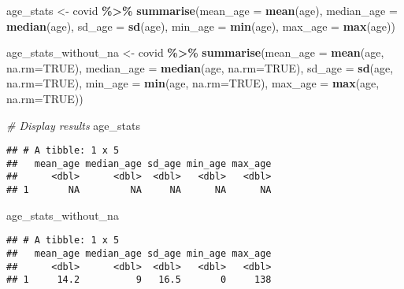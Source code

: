 \documentclass[
]{book}
\newenvironment{Shaded}{\begin{snugshade}}{\end{snugshade}}
\newcommand{\AttributeTok}[1]{\textcolor[rgb]{0.13,0.29,0.53}{#1}}
\newcommand{\CommentTok}[1]{\textcolor[rgb]{0.56,0.35,0.01}{\textit{#1}}}
\newcommand{\ConstantTok}[1]{\textcolor[rgb]{0.56,0.35,0.01}{#1}}
\newcommand{\FunctionTok}[1]{\textcolor[rgb]{0.13,0.29,0.53}{\textbf{#1}}}
\newcommand{\NormalTok}[1]{#1}
\newcommand{\OtherTok}[1]{\textcolor[rgb]{0.56,0.35,0.01}{#1}}
\newcommand{\SpecialCharTok}[1]{\textcolor[rgb]{0.81,0.36,0.00}{\textbf{#1}}}
\begin{document}
\begin{Shaded}
\begin{Highlighting}[]
\NormalTok{age\_stats }\OtherTok{\textless{}{-}}\NormalTok{ covid }\SpecialCharTok{\%\textgreater{}\%}
  \FunctionTok{summarise}\NormalTok{(}\AttributeTok{mean\_age =} \FunctionTok{mean}\NormalTok{(age),}
            \AttributeTok{median\_age =} \FunctionTok{median}\NormalTok{(age),}
            \AttributeTok{sd\_age =} \FunctionTok{sd}\NormalTok{(age),}
            \AttributeTok{min\_age =} \FunctionTok{min}\NormalTok{(age),}
            \AttributeTok{max\_age =} \FunctionTok{max}\NormalTok{(age))}


\NormalTok{age\_stats\_without\_na }\OtherTok{\textless{}{-}}\NormalTok{ covid }\SpecialCharTok{\%\textgreater{}\%}
  \FunctionTok{summarise}\NormalTok{(}\AttributeTok{mean\_age =} \FunctionTok{mean}\NormalTok{(age, }\AttributeTok{na.rm=}\ConstantTok{TRUE}\NormalTok{),}
            \AttributeTok{median\_age =} \FunctionTok{median}\NormalTok{(age, }\AttributeTok{na.rm=}\ConstantTok{TRUE}\NormalTok{),}
            \AttributeTok{sd\_age =} \FunctionTok{sd}\NormalTok{(age, }\AttributeTok{na.rm=}\ConstantTok{TRUE}\NormalTok{),}
            \AttributeTok{min\_age =} \FunctionTok{min}\NormalTok{(age, }\AttributeTok{na.rm=}\ConstantTok{TRUE}\NormalTok{),}
            \AttributeTok{max\_age =} \FunctionTok{max}\NormalTok{(age, }\AttributeTok{na.rm=}\ConstantTok{TRUE}\NormalTok{))}

\CommentTok{\# Display results}
\NormalTok{age\_stats}
\end{Highlighting}
\end{Shaded}

\begin{verbatim}
## # A tibble: 1 x 5
##   mean_age median_age sd_age min_age max_age
##      <dbl>      <dbl>  <dbl>   <dbl>   <dbl>
## 1       NA         NA     NA      NA      NA
\end{verbatim}

\begin{Shaded}
\begin{Highlighting}[]
\NormalTok{age\_stats\_without\_na}
\end{Highlighting}
\end{Shaded}

\begin{verbatim}
## # A tibble: 1 x 5
##   mean_age median_age sd_age min_age max_age
##      <dbl>      <dbl>  <dbl>   <dbl>   <dbl>
## 1     14.2          9   16.5       0     138
\end{verbatim}
\end{document}
